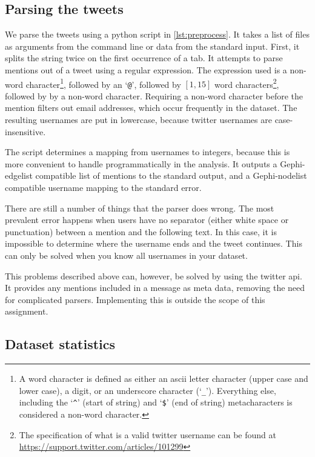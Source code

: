 \documentclass[a4paper,10pt,hidelinks]{article}
\begin{document}
\subsection{Parsing the tweets}

We parse the tweets using a python script in \autoref{lst:preprocess}. It takes a list of files as arguments from the command line or data from the standard input. First, it splits the string twice on the first occurrence of a tab. It attempts to parse mentions out of a tweet using a regular expression. The expression used is a non-word character\footnote{A word character is defined as either an ascii letter character (upper case and lower case), a digit, or an underscore character (`\texttt{\_}'). Everything else, including the `\texttt{\^}' (start of string) and `\texttt{\$}' (end of string) metacharacters is considered a non-word character.}, followed by an `\texttt{@}', followed by $[1, 15]$ word characters\footnote{The specification of what is a valid twitter username can be found at \url{https://support.twitter.com/articles/101299}}, followed by by a non-word character. Requiring a non-word character before the mention filters out email addresses, which occur frequently in the dataset. The resulting usernames are put in lowercase, because twitter usernames are case-insensitive.

The script determines a mapping from usernames to integers, because this is more convenient to handle programmatically in the analysis. It outputs a Gephi-edgelist compatible list of mentions to the standard output, and a Gephi-nodelist compatible username mapping to the standard error.

There are still a number of things that the parser does wrong. The most prevalent error happens when users have no separator (either white space or punctuation) between a mention and the following text. In this case, it is impossible to determine where the username ends and the tweet continues. This can only be solved when you know all usernames in your dataset.

This problems described above can, however, be solved by using the twitter api. It provides any mentions included in a message as meta data, removing the need for complicated parsers. Implementing this is outside the scope of this assignment.

\subsection{Dataset statistics}
\end{document}
